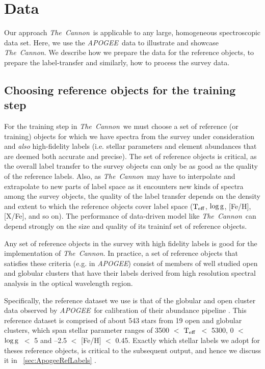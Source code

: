\documentclass[12pt, preprint]{aastex}
\newcommand{\teff}{\mbox{$\rm T_{eff}$}}
\newcommand{\logg}{\mbox{$\rm \log g$}}
\newcommand{\tc}{\textsl{The~Cannon}}
\newcommand{\apogee}{\textsl{APOGEE}}
\begin{document}
\section{Data}\label{sec:Data}
Our approach \tc \ is applicable to any large, homogeneous spectroscopic data set. Here, we use the \apogee\ data \citep{Ahn2014} to illustrate and showcase \tc . 
We describe how we prepare the data for the reference objects, to prepare the label-transfer and similarly, how to process the survey data.

\subsection{Choosing reference objects for the training step}
\label{sec:ReferenceObjects}

For the training step in \tc\ we must choose a set of reference (or training) objects for which we have spectra from the survey under consideration and \emph{also} high-fidelity labels (i.e. stellar parameters and element abundances that are deemed both accurate and precise).
The set of reference objects is critical, as the overall label transfer to the survey objects can only be as good as the quality of the reference labels. 
Also, as \tc\ may have to interpolate and extrapolate to new parts of label space as
it encounters new kinds of spectra among the survey objects, the quality
of the label transfer depends on the density and extent to which the reference objects
cover label space (\teff, \logg, [Fe/H], [X/Fe], and so on). 
The performance of data-driven model like \tc\ can depend strongly on the size and quality of its traininf set of reference objects.

Any set of reference objects in the survey with high fidelity labels is good for the implementation of \tc.
In practice, a set of reference objects that satisfies these criteria (e.g. in \apogee )
consist of members of well studied open and globular clusters that have their labels derived from high resolution spectral analysis in the
optical wavelength region.

Specifically, the reference dataset we use is that of the globular and open cluster data observed by \apogee\ for calibration of their abundance pipeline \citep{Meszaros2013}. 
This reference dataset is comprised of about 543 stars from 19 open and globular clusters, which span stellar parameter ranges 
of 3500 $<$ \teff\ $<$ 5300, 0 $<$ \logg\ $<$ 5 and --2.5 $<$ [Fe/H] $<$ 0.45. 
Exactly which stellar labels we adopt for theses reference objects, is critical to the subsequent output, and hence we discuss it in ~\ref{sec:ApogeeRefLabels} .
\end{document}
